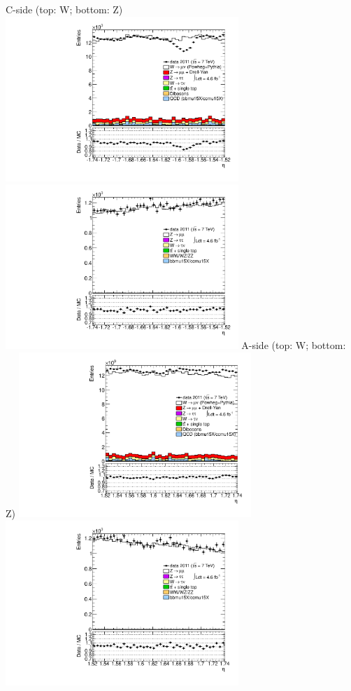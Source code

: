  {
\colb[T]
C-side (top: W; bottom: Z)
\centering
\includegraphics[width=0.66\textwidth]{dates/20130306/figures/etaphi/W_8_C_stack_l_eta_POS} \\
\includegraphics[width=0.66\textwidth]{dates/20130306/figures/etaphi/Z_8_C_stack_lP_eta_ALL.pdf}
A-side (top: W; bottom: Z)
\centering
\includegraphics[width=0.66\textwidth]{dates/20130306/figures/etaphi/W_8_A_stack_l_eta_POS} \\
\includegraphics[width=0.66\textwidth]{dates/20130306/figures/etaphi/Z_8_A_stack_lP_eta_ALL.pdf} 
\cole
}
